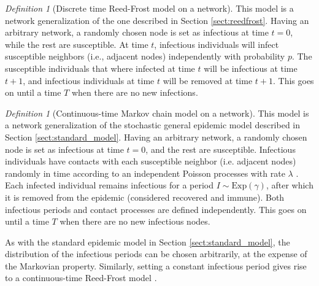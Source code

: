 \documentclass[aap]{imsart}
\theoremstyle{remark}
\newtheorem{definition}[theorem]{Definition}
\begin{document}
\begin{definition}[Discrete time Reed-Frost model on a network]
This model is a network generalization of the one described in Section \ref{sect:reedfrost}. Having an arbitrary network, a randomly chosen node is set as infectious at time $t = 0$, while the rest are susceptible. At time $t$, infectious individuals will infect susceptible neighbors (i.e., adjacent nodes) independently with probability $p$. The susceptible individuals that where infected at time $t$ will be infectious at time $t+1$, and infectious individuals at time $t$ will be removed at time $t+1$. This goes on until a time $T$ when there are no new infections.
\end{definition}


\begin{definition}[Continuous-time Markov chain model on a network]
	This model is a network generalization of the stochastic general epidemic model described in Section \ref{sect:standard_model}. Having an arbitrary network, a randomly chosen node is set as infectious at time $t = 0$, and the rest are susceptible. Infectious individuals have contacts with each susceptible neighbor (i.e. adjacent nodes) randomly in time according to an independent Poisson processes with rate $\lambda$ \citep{lawler_2006}. Each infected individual remains infectious for a period $I \sim \mathrm{Exp}(\gamma)$, after which it is removed from the epidemic (considered recovered and immune). Both infectious periods and contact processes are defined independently. This goes on until a time $T$ when there are no new infectious nodes.	
\end{definition}

As with the standard epidemic model in Section \ref{sect:standard_model}, the distribution of the infectious periods can be chosen arbitrarily, at the expense of the Markovian property. Similarly, setting a constant infectious period gives rise to a continuous-time Reed-Frost model \citep{Britton_2019}.
\end{document}
